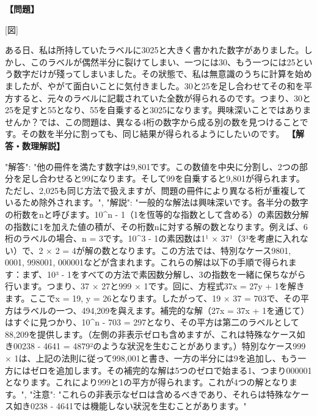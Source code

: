 \documentclass[10pt,a4paper,oneside,openany]{ltjsbook}
\begin{document}
\begin{tcolorbox}[colback=softblue,colframe=primaryblue,title=\textbf{第 113 問：THE TORN NUMBER.},arc=2mm,boxrule=1pt,breakable]
\textbf{【問題】}\par\vspace{0.3em}

[図]

ある日、私は所持していたラベルに3025と大きく書かれた数字がありました。しかし、このラベルが偶然半分に裂けてしまい、一つには30、もう一つには25という数字だけが殘ってしまいました。その狀態で、私は無意識のうちに計算を始めましたが、やがて面白いことに気付きました。30と25を足し合わせてその和を平方すると、元々のラベルに記載されていた全数が得られるのです。つまり、30と25を足すと55となり、55を自乗すると3025になります。興味深いことではありませんか？では、この問題は、異なる4桁の数字から成る別の数を見つけることです。その数を半分に割っても、同じ結果が得られるようにしたいのです。
\tcblower
\textbf{【解答・数理解説】}\par\vspace{0.3em}
{
"解答": "他の冊件を満たす数字は9,801です。この数値を中央に分割し、2つの部分を足し合わせると99になります。そして99を自乗すると9,801が得られます。ただし、2,025も同じ方法で扱えますが、問題の冊件により異なる桁が重複しているため除外されます。",
"解説": "一般的な解法は興味深いです。各半分の数字の桁数をnと呼びます。10\textasciicircum{}n - 1（1を恆等的な指数として含める）の素因数分解の指数に1を加えた値の積が、その桁数nに対する解の数となります。例えば、6桁のラベルの場合、n = 3です。10\textasciicircum{}3 - 1の素因数は1¹ × 37¹（3³を考慮に入れない）で、2 × 2 = 4が解の数となります。この方法では、特別なケース9801, 0001, 998001, 000001などが含まれます。これらの解は以下の手順で得られます：まず、10³ - 1をすべての方法で素因数分解し、3の指数を一緒に保ちながら行います。つまり、37 × 27と999 × 1です。回に、方程式37x = 27y + 1を解きます。ここでx = 19, y = 26となります。したがって、19 × 37 = 703で、その平方はラベルの一つ、494,209を與えます。補完的な解（27x = 37x + 1を通じて）はすぐに見つかり、10\textasciicircum{}n - 703 = 297となり、その平方は第二のラベルとして88,209を提供します。（左側の非表示ゼロも含めますが、これは特殊なケース如き00238 - 4641 = 4879²のような狀況を生むことがあります。）特別なケース999 × 1は、上記の法則に従って998,001と書き、一方の半分には9を追加し、もう一方にはゼロを追加します。その補完的な解は5つのゼロで始まる1、つまり000001となります。これにより999と1の平方が得られます。これが4つの解となります。",
"注意": "これらの非表示なゼロは含めるべきであり、それらは特殊なケース如き0238 - 4641では機能しない狀況を生むことがあります。"
}
\end{tcolorbox}
\end{document}
